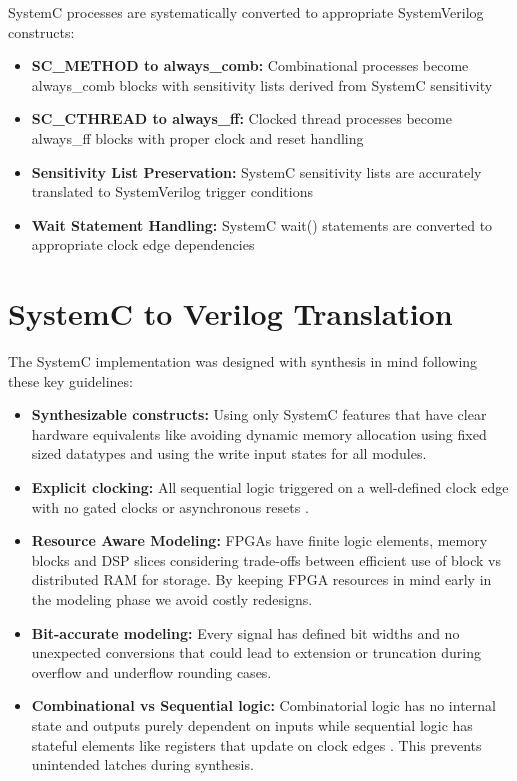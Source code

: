 SystemC processes are systematically converted to appropriate SystemVerilog constructs:

\begin{itemize}
\item \textbf{SC\_METHOD to always\_comb:} Combinational processes become always\_comb blocks with sensitivity lists derived from SystemC sensitivity
\item \textbf{SC\_CTHREAD to always\_ff:} Clocked thread processes become always\_ff blocks with proper clock and reset handling
\item \textbf{Sensitivity List Preservation:} SystemC sensitivity lists are accurately translated to SystemVerilog trigger conditions
\item \textbf{Wait Statement Handling:} SystemC wait() statements are converted to appropriate clock edge dependencies
\end{itemize}

\section{SystemC to Verilog Translation}
\label{sec:systemc_to_verilog}

The SystemC implementation was designed with synthesis in mind following these key guidelines:

\begin{itemize}
    \item \textbf{Synthesizable constructs:} Using only SystemC features that have clear hardware equivalents like avoiding dynamic memory allocation using fixed sized datatypes and using the write input states for all modules.
    
    \item \textbf{Explicit clocking:} All sequential logic triggered on a well-defined clock edge with no gated clocks or asynchronous resets \cite{ref13}.
    
    \item \textbf{Resource Aware Modeling:} FPGAs have finite logic elements, memory blocks and DSP slices considering trade-offs between efficient use of block vs distributed RAM for storage. By keeping FPGA resources in mind early in the modeling phase we avoid costly redesigns.
    
    \item \textbf{Bit-accurate modeling:} Every signal has defined bit widths and no unexpected conversions that could lead to extension or truncation during overflow and underflow rounding cases.
    
    \item \textbf{Combinational vs Sequential logic:} Combinatorial logic has no internal state and outputs purely dependent on inputs while sequential logic has stateful elements like registers that update on clock edges \cite{ref17}. This prevents unintended latches during synthesis.
\end{itemize}

